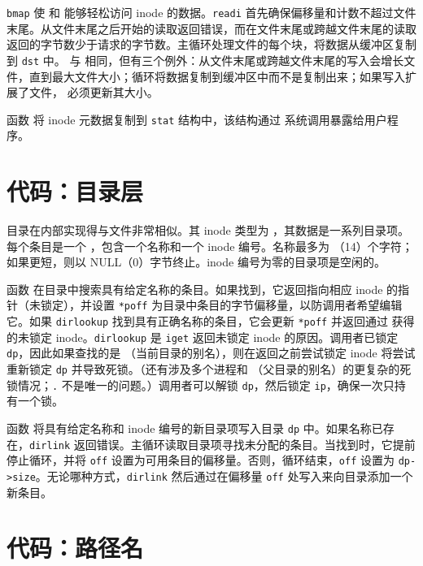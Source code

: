\lstinline{bmap} 使  和  能够轻松访问 inode 的数据。\lstinline{readi} 首先确保偏移量和计数不超过文件末尾。从文件末尾之后开始的读取返回错误，而在文件末尾或跨越文件末尾的读取返回的字节数少于请求的字节数。主循环处理文件的每个块，将数据从缓冲区复制到 \lstinline{dst} 中。 与  相同，但有三个例外：从文件末尾或跨越文件末尾的写入会增长文件，直到最大文件大小；循环将数据复制到缓冲区中而不是复制出来；如果写入扩展了文件， 必须更新其大小。

函数  将 inode 元数据复制到 \lstinline{stat} 结构中，该结构通过  系统调用暴露给用户程序。
\section{代码：目录层}

目录在内部实现得与文件非常相似。其 inode 类型为 ，其数据是一系列目录项。每个条目是一个 ，包含一个名称和一个 inode 编号。名称最多为 （14）个字符；如果更短，则以 NULL（0）字节终止。inode 编号为零的目录项是空闲的。

函数  在目录中搜索具有给定名称的条目。如果找到，它返回指向相应 inode 的指针（未锁定），并设置 \lstinline{*poff} 为目录中条目的字节偏移量，以防调用者希望编辑它。如果 \lstinline{dirlookup} 找到具有正确名称的条目，它会更新 \lstinline{*poff} 并返回通过  获得的未锁定 inode。\lstinline{dirlookup} 是 \lstinline{iget} 返回未锁定 inode 的原因。调用者已锁定 \lstinline{dp}，因此如果查找的是 （当前目录的别名），则在返回之前尝试锁定 inode 将尝试重新锁定 \lstinline{dp} 并导致死锁。（还有涉及多个进程和 （父目录的别名）的更复杂的死锁情况；\lstinline{.} 不是唯一的问题。）调用者可以解锁 \lstinline{dp}，然后锁定 \lstinline{ip}，确保一次只持有一个锁。

函数  将具有给定名称和 inode 编号的新目录项写入目录 \lstinline{dp} 中。如果名称已存在，\lstinline{dirlink} 返回错误。主循环读取目录项寻找未分配的条目。当找到时，它提前停止循环，并将 \lstinline{off} 设置为可用条目的偏移量。否则，循环结束，\lstinline{off} 设置为 \lstinline{dp->size}。无论哪种方式，\lstinline{dirlink} 然后通过在偏移量 \lstinline{off} 处写入来向目录添加一个新条目。
\section{代码：路径名}

